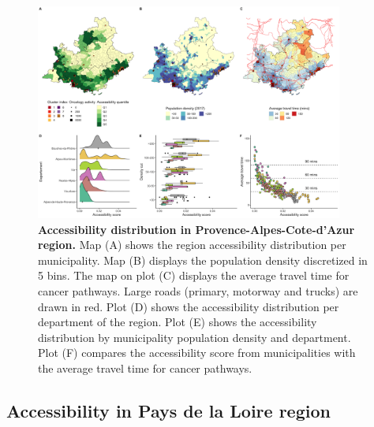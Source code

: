 \begin{figure}[h!]
    \includegraphics[width=0.9\textwidth]{images/camion/fig4_accessibility_Provence-Alpes-Cote-d'Azur.png}
    \centering
    \caption{ \textbf{Accessibility distribution in Provence-Alpes-Cote-d'Azur
            region.} Map (A) shows the region accessibility distribution per
        municipality. Map (B) displays the population density discretized in 5
        bins. The map on plot (C) displays the average travel time for cancer
        pathways. Large roads (primary, motorway and trucks) are drawn in red.
        Plot (D) shows the accessibility distribution per department of the
        region. Plot (E) shows the accessibility distribution by municipality
        population density and department. Plot (F) compares the accessibility
        score from municipalities with the average travel time for cancer
        pathways. }
    \label{fig:accessibility-paca}
\end{figure}

\subsection*{Accessibility in Pays de la Loire region}

